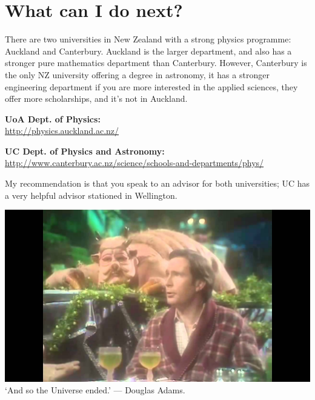 \documentclass[a4paper]{amsbook}
\theoremstyle{definition}
\numberwithin{exercise}{chapter}
\numberwithin{exercise}{chapter}
\begin{document}
\section*{What can I do next?}
There are two universities in New Zealand with a strong physics programme: Auckland and Canterbury. Auckland is the larger department, and also has a stronger
pure mathematics department than Canterbury. However, Canterbury is the only NZ university offering a degree in astronomy, it has a stronger engineering department
if you are more interested in the applied sciences, they offer more scholarships, and it's not in Auckland.

\textbf{UoA Dept. of Physics:}\\\null\qquad\url{http://physics.auckland.ac.nz/}

\textbf{UC Dept. of Physics and Astronomy:}\\\null\qquad\url{http://www.canterbury.ac.nz/science/schools-and-departments/phys/}

My recommendation is that you speak to an advisor for both universities; UC has a very helpful advisor stationed in Wellington.

\clearpage

\thispagestyle{empty}
\vspace*{\fill}

\begin{center}
  \includegraphics[width=\textwidth]{hitchhiker}
  `And so the Universe ended.' --- Douglas Adams.
\end{center}

\vspace*{\fill}
\end{document}
